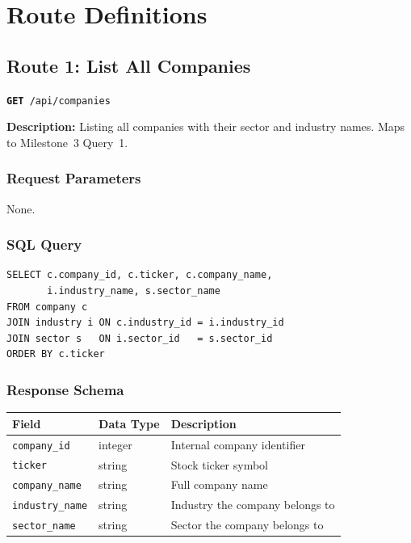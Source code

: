 \documentclass[11pt]{article}
\newcommand{\route}[2]{\texttt{\textcolor{routecolor}{\textbf{#1}}~#2}}
\begin{document}
\newpage
\section{Route Definitions}

\subsection{Route 1: List All Companies}

\route{GET}{/api/companies}

\medskip\noindent
\textbf{Description:} Listing all companies with their sector and industry names. Maps to Milestone~3 Query~1.

\subsubsection*{Request Parameters}

None.

\subsubsection*{SQL Query}
\begin{lstlisting}[style=sql,basicstyle=\ttfamily\scriptsize]
SELECT c.company_id, c.ticker, c.company_name,
       i.industry_name, s.sector_name
FROM company c
JOIN industry i ON c.industry_id = i.industry_id
JOIN sector s   ON i.sector_id   = s.sector_id
ORDER BY c.ticker
\end{lstlisting}

\subsubsection*{Response Schema}

\begin{center}
\small
\begin{tabular}{l l p{7cm}}
\toprule
\textbf{Field} & \textbf{Data Type} & \textbf{Description} \\
\midrule
\texttt{company\_id}    & integer & Internal company identifier \\
\texttt{ticker}         & string  & Stock ticker symbol \\
\texttt{company\_name}  & string  & Full company name \\
\texttt{industry\_name} & string  & Industry the company belongs to \\
\texttt{sector\_name}   & string  & Sector the company belongs to \\
\bottomrule
\end{tabular}
\end{center}
\end{document}
